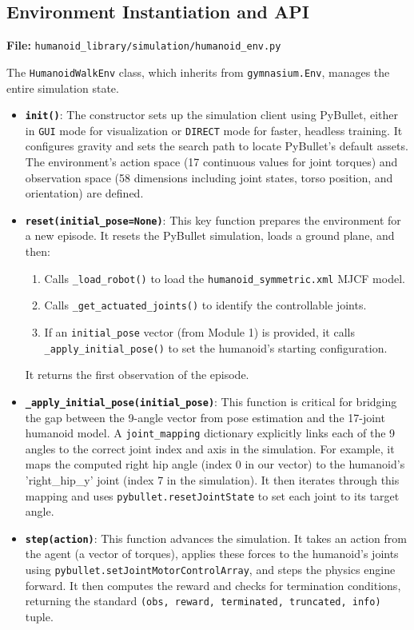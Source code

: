 \documentclass{article}
\begin{document}
\subsection{Environment Instantiation and API}
\textbf{File:} \texttt{humanoid_library/simulation/humanoid_env.py}

The \texttt{HumanoidWalkEnv} class, which inherits from \texttt{gymnasium.Env}, manages the entire simulation state.

\begin{itemize}
    \item \texttt{\textbf{\textunderscore\textunderscore init\textunderscore\textunderscore()}}: The constructor sets up the simulation client using PyBullet, either in \texttt{GUI} mode for visualization or \texttt{DIRECT} mode for faster, headless training. It configures gravity and sets the search path to locate PyBullet's default assets. The environment's action space (17 continuous values for joint torques) and observation space (58 dimensions including joint states, torso position, and orientation) are defined.
    
    \item \texttt{\textbf{reset(initial_pose=None)}}: This key function prepares the environment for a new episode. It resets the PyBullet simulation, loads a ground plane, and then:
    \begin{enumerate}
        \item Calls \texttt{\_load_robot()} to load the \texttt{humanoid_symmetric.xml} MJCF model.
        \item Calls \texttt{\_get_actuated_joints()} to identify the controllable joints.
        \item If an \texttt{initial_pose} vector (from Module 1) is provided, it calls \texttt{\_apply_initial_pose()} to set the humanoid's starting configuration.
    \end{enumerate}
    It returns the first observation of the episode.
    
    \item \texttt{\textbf{\_apply_initial_pose(initial_pose)}}: This function is critical for bridging the gap between the 9-angle vector from pose estimation and the 17-joint humanoid model. A \texttt{joint_mapping} dictionary explicitly links each of the 9 angles to the correct joint index and axis in the simulation. For example, it maps the computed right hip angle (index 0 in our vector) to the humanoid's 'right_hip_y' joint (index 7 in the simulation). It then iterates through this mapping and uses \texttt{pybullet.resetJointState} to set each joint to its target angle.
    
    \item \texttt{\textbf{step(action)}}: This function advances the simulation. It takes an action from the agent (a vector of torques), applies these forces to the humanoid's joints using \texttt{pybullet.setJointMotorControlArray}, and steps the physics engine forward. It then computes the reward and checks for termination conditions, returning the standard \texttt{(obs, reward, terminated, truncated, info)} tuple.
\end{itemize}
\end{document}
